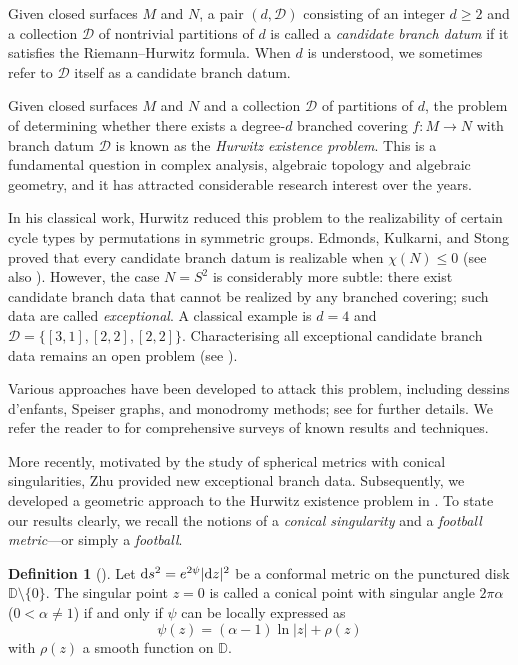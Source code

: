 \documentclass[microtype]{gtpart}     %
\theoremstyle{definition}
\newtheorem{defn}[thm]{Definition}    %
\begin{document}
Given closed surfaces $M$ and $N$, a pair $(d, \mathcal D)$ consisting of an integer $d \geq 2$ and a collection $\mathcal D$ of nontrivial partitions of $d$ is called a \emph{candidate branch datum} if it satisfies the Riemann--Hurwitz formula. When $d$ is understood, we sometimes refer to $\mathcal D$ itself as a candidate branch datum.

Given closed surfaces $M$ and $N$ and a collection $\mathcal D$ of partitions of $d$, the problem of determining whether there exists a degree-$d$ branched covering $f: M \to N$ with branch datum $\mathcal D$ is known as the \emph{Hurwitz existence problem}. This is a fundamental question in complex analysis, algebraic topology and algebraic geometry, and it has attracted considerable research interest over the years.

In his classical work, Hurwitz \cite{Hur91} reduced this problem to the realizability of certain cycle types by permutations in symmetric groups. Edmonds, Kulkarni, and Stong \cite{EKS84} proved that every candidate branch datum is realizable when $\chi(N) \leq 0$ (see also \cite{EZ78,Hus62}). However, the case $N = S^2$ is considerably more subtle: there exist candidate branch data that cannot be realized by any branched covering; such data are called \emph{exceptional}. A classical example is $d = 4$ and $\mathcal{D} = \{[3,1], [2,2], [2,2]\}$. Characterising all exceptional candidate branch data remains an open problem (see \cite{Zhe06,Zhu19,WWX25}).

Various approaches have been developed to attack this problem, including dessins d'enfants, Speiser graphs, and monodromy methods; see \cite{Bar01, BP23, EKS84, Ger87, KZ96, Med84, Med90, MSS04, OP06, Pak09, P20, PP09, PP12, PP06, PP07, PP08, SX20, Th65} for further details. We refer the reader to \cite{P20, PP08} for comprehensive surveys of known results and techniques.

More recently, motivated by the study of spherical metrics with conical singularities, Zhu \cite{Zhu19} provided new exceptional branch data. Subsequently, we developed a geometric approach to the Hurwitz existence problem in \cite{Wei26}. To state our results clearly, we recall the notions of a \emph{conical singularity} and a \emph{football metric}---or simply a \emph{football}.

\begin{defn}[\cite{WZ}]\label{DF1}
Let ${\rm d}s^{2}=e^{2\psi}|{\rm d}z|^{2}$ be a conformal metric on the punctured disk $\mathbb{D}\setminus\{0\}$. The singular point $z=0$ is called a conical point with singular angle $2\pi\alpha$ ($0<\alpha\neq 1$) if and only if $\psi$ can be locally expressed as
\[
\psi(z)=(\alpha-1)\ln |z|+\rho(z)
\]
with $\rho(z)$ a smooth function on $\mathbb{D}$.
\end{defn}
\end{document}
